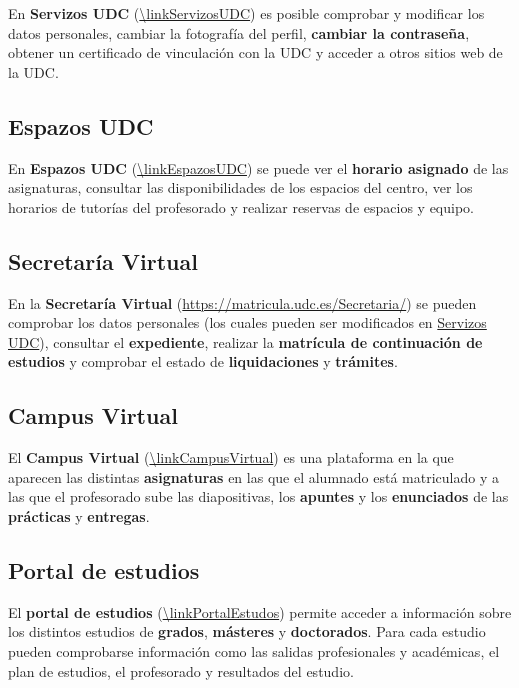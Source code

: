 En \textbf{Servizos UDC} (\url{\linkServizosUDC}) es posible comprobar y modificar los datos personales, cambiar la fotografía del perfil, \textbf{cambiar la contraseña}, obtener un certificado de vinculación con la \acrshort{UDC} y acceder a otros sitios web de la \acrshort{UDC}.

\subsection{Espazos UDC}

En \textbf{Espazos UDC} (\url{\linkEspazosUDC}) se puede ver el \textbf{horario asignado} de las asignaturas, consultar las disponibilidades de los espacios del centro, ver los horarios de tutorías del profesorado y realizar reservas de espacios y equipo. 

\subsection{Secretaría Virtual}

En la \textbf{Secretaría Virtual} (\url{https://matricula.udc.es/Secretaria/}) se pueden comprobar los datos personales (los cuales pueden ser modificados en \href{\linkServizosUDC}{Servizos UDC}), consultar el \textbf{expediente}, realizar la \textbf{matrícula de continuación de estudios} y comprobar el estado de \textbf{liquidaciones} y \textbf{trámites}.

\subsection{Campus Virtual}

El \textbf{Campus Virtual} (\url{\linkCampusVirtual}) es una plataforma en la que aparecen las distintas \textbf{asignaturas} en las que el alumnado está matriculado y a las que el profesorado sube las diapositivas, los \textbf{apuntes} y los \textbf{enunciados} de las \textbf{prácticas} y \textbf{entregas}.

\subsection{Portal de estudios}

El \textbf{portal de estudios} (\url{\linkPortalEstudos}) permite acceder a información sobre los distintos estudios de \textbf{grados}, \textbf{másteres} y \textbf{doctorados}. Para cada estudio pueden comprobarse información como las salidas profesionales y académicas, el plan de estudios, el profesorado y resultados del estudio.
